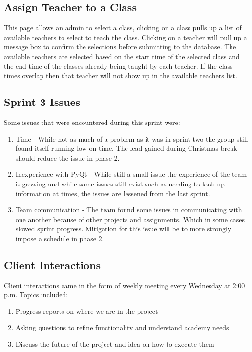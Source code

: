 \subsection{Assign Teacher to a Class}
This page allows an admin to select a class, clicking on a class pulls up a list of available teachers to select to teach the class. Clicking on a teacher will pull up a message box to confirm the selections before submitting to the database. The available teachers are selected based on the start time of the selected class and the end time of the classes already being taught by each teacher. If the class times overlap then that teacher will not show up in the available teachers list.

\subsection{Sprint 3 Issues}
Some issues that were encountered during this sprint were:

\begin{enumerate}
\item Time - While not as much of a problem as it was in sprint two the group still found itself running low on time. The lead gained during Christmas break should reduce the issue in phase 2.
\item Inexperience with PyQt - While still a small issue the experience of the team is growing and while some issues still exist such as needing to look up information at times, the issues are lessened from the last sprint.
\item Team communication - The team found some issues in communicating with one another because of other projects and assignments. Which in some cases slowed sprint progress. Mitigation for this issue will be to more strongly impose a schedule in phase 2.
\end{enumerate}

\subsection{Client Interactions}

Client interactions came in the form of weekly meeting every Wednesday at 2:00 p.m. Topics included:

\begin{enumerate}
\item Progress reports on where we are in the project
\item Asking questions to refine functionality and understand academy needs
\item Discuss the future of the project and idea on how to execute them
\end{enumerate}


